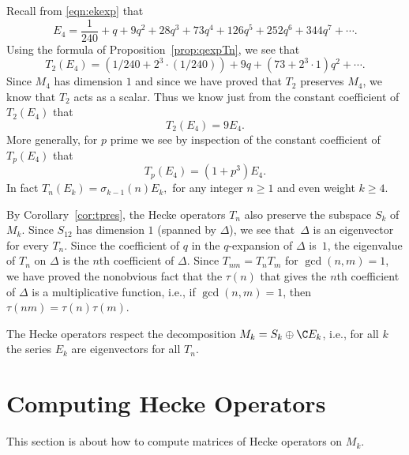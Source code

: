 \begin{example}
Recall from \eqref{eqn:ekexp} that 
$$
E_4 = \frac{1}{240} + q + 9q^2 + 28q^3 + 73q^4 + 126q^5 + 252q^6 + 344q^7
+\cdots.
$$
Using the formula of Proposition~\ref{prop:qexpTn}, we see
that 
$$
T_2(E_4) = (1/240 + 2^3\cdot (1/240)) + 9q + (73 + 2^3\cdot 1) q^2 + \cdots.
$$
Since $M_4$ has dimension $1$ and since we have proved that $T_2$
preserves $M_4$, we know that $T_2$ acts as a scalar.  Thus
we know just from the constant coefficient of $T_2(E_4)$ that
$$T_2(E_4) = 9 E_4.$$
More generally, for $p$ prime we see by inspection of
the constant coefficient of $T_p(E_4)$ that 
$$
  T_p(E_4) = (1+p^3)E_4.
$$
In fact
$
 T_n(E_k) = \sigma_{k-1}(n) E_k,
$
for any integer $n\geq 1$ and even weight $k\geq 4$.
\end{example}

\begin{example}
  By Corollary~\ref{cor:tpres}, the Hecke operators $T_n$ also
  preserve the subspace $S_k$ of $M_k$.  Since $S_{12}$ has dimension
  $1$ (spanned by $\Delta$), we see that~$\Delta$ is an eigenvector
  for every $T_n$.  Since the coefficient of $q$ in the $q$-expansion
  of $\Delta$ is~$1$, the eigenvalue of $T_n$ on $\Delta$ is the $n$th
  coefficient of $\Delta$.  Since $T_{nm}=T_n T_m$ for $\gcd(n,m)=1$,
  we have proved the nonobvious fact that the  $\tau(n)$ that gives the $n$th coefficient of $\Delta$
  is a multiplicative function, i.e., if $\gcd(n,m)=1$, then
  $\tau(nm)=\tau(n)\tau(m)$.
\end{example}

\begin{remark}
  The Hecke operators respect the decomposition $M_k = S_k \oplus \C E_k$,
  i.e., for all $k$ the series $E_k$ are eigenvectors for all $T_n$.
\end{remark}

\section{Computing Hecke Operators}
This section is about how to compute matrices
of Hecke operators on $M_k$.


